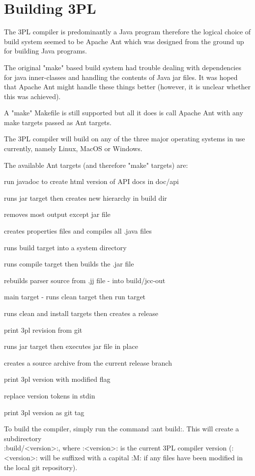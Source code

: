 \pagebreak

\chapter{Building 3PL}

The 3PL compiler is predominantly a Java program therefore the logical choice
of build system seemed to be Apache Ant which was designed from the ground up
for building Java programs.

The original "make" based build system had trouble dealing with dependencies
for java inner-classes and handling the contents of Java jar files. It was
hoped that Apache Ant might handle these things better (however, it is
unclear whether this was achieved).

A "make" Makefile is still supported but all it does is call Apache Ant with
any make targets passed as Ant targets.

The 3PL compiler will build on any of the three major operating systems in
use currently, namely Linux, MacOS or Windows.

The available Ant targets (and therefore "make" targets) are:
\begin{description}[leftmargin=!,labelwidth=\widthof{\bfseries versionfilter}]
\item[api]           run javadoc to create html version of API docs in doc/api
\item[build]         runs jar target then creates new hierarchy in build dir
\item[clean]         removes most output except jar file
\item[compile]       creates properties files and compiles all .java files
\item[install]       runs build target into a system directory
\item[jar]           runs compile target then builds the .jar file
\item[javacc]        rebuilds parser source from .jj file - into build/jcc-out
\item[main]          main target - runs clean target then run target
\item[release]       runs clean and install targets then creates a release
\item[revision]      print 3pl revision from git
\item[run]           runs jar target then executes jar file in place
\item[source]        creates a source archive from the current release branch
\item[version]       print 3pl version with modified flag
\item[versionfilter] replace version tokens in stdin
\item[versiontag]    print 3pl version as git tag
\end{description}
To build the compiler, simply run the command \bverb:ant build:. This will
create a subdirectory \\ \bverb:build/<version>:, where \bverb:<version>: is the
current 3PL compiler version (\bverb:<version>: will be suffixed with a
capital \bverb:M: if any files have been modified in the local git repository).

